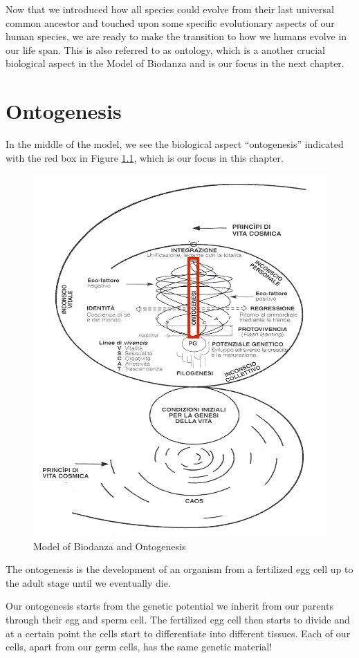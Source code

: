 \documentclass[
  11pt,
]{book}
\begin{document}
Now that we introduced how all species could evolve from their last universal common ancestor and touched upon some specific evolutionary aspects of our human species, we are ready to make the transition to how we humans evolve in our life span. This is also referred to as ontology, which is a another crucial biological aspect in the Model of Biodanza and is our focus in the next chapter.

\hypertarget{ontogenesis}{%
\chapter{Ontogenesis}\label{ontogenesis}}

In the middle of the model, we see the biological aspect ``ontogenesis'' indicated with the red box in Figure \ref{fig:modelOnto}, which is our focus in this chapter.

\begin{figure}

{\centering \includegraphics[width=0.5\linewidth]{./figs/biologischeAspectenBiodanzaDeelIII} 

}

\caption{Model of Biodanza and Ontogenesis}\label{fig:modelOnto}
\end{figure}

The ontogenesis is the development of an organism from a fertilized egg cell up to the adult stage until we eventually die.

Our ontogenesis starts from the genetic potential we inherit from our parents through their egg and sperm cell. The fertilized egg cell then starts to divide and at a certain point the cells start to differentiate into different tissues.
Each of our cells, apart from our germ cells, has the same genetic material!
\end{document}
